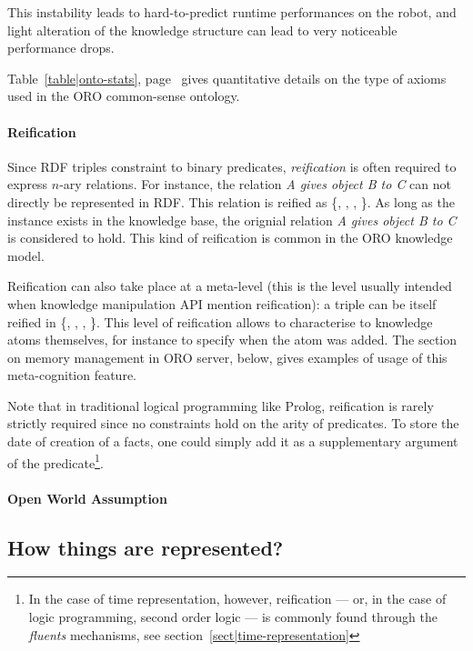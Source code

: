 This instability leads to hard-to-predict runtime performances on the robot,
and light alteration of the knowledge structure can lead to very noticeable
performance drops.

Table~\ref{table|onto-stats}, page~\pageref{table|onto-stats} gives
quantitative details on the type of axioms used in the ORO common-sense
ontology.

\paragraph{Reification} Since RDF triples constraint to binary predicates,
\emph{reification} is often required to express $n$-ary relations. For
instance, the relation \emph{A gives object B to C} can not directly be
represented in RDF. This relation is reified as \{,
, , \}. As
long as the instance  exists in the knowledge base, the orignial
relation \emph{A gives object B to C} is considered to hold. This kind of
reification is common in the ORO knowledge model.

Reification can also take place at a meta-level (this is the level usually
intended when knowledge manipulation API mention reification): a triple
 can be itself reified in \{, , , \}. This level of reification allows
to characterise to knowledge atoms themselves, for instance to specify when the
atom was added. The section on memory management in ORO server, below, gives
examples of usage of this meta-cognition feature.

Note that in traditional logical programming like Prolog, reification is rarely
strictly required since no constraints hold on the arity of predicates. To
store the date of creation of a facts, one could simply add it as a
supplementary argument of the predicate\footnote{In the case of time
representation, however, reification --- or, in the case of logic programming,
second order logic --- is commonly found through the \emph{fluents} mechanisms,
see section~\ref{sect|time-representation}}.

\paragraph{Open World Assumption}

\subsection{How things are represented?}

